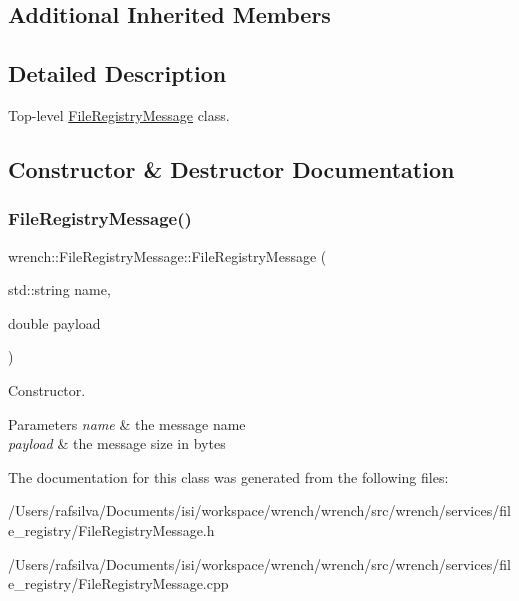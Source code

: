 \subsection*{Additional Inherited Members}


\subsection{Detailed Description}
Top-\/level \hyperlink{classwrench_1_1_file_registry_message}{File\+Registry\+Message} class. 

\subsection{Constructor \& Destructor Documentation}
\mbox{\label{classwrench_1_1_file_registry_message_a52902c49d15ab099f7ee1266652f62e3}} 
\subsubsection{\texorpdfstring{File\+Registry\+Message()}{FileRegistryMessage()}}
{\footnotesize\ttfamily wrench\+::\+File\+Registry\+Message\+::\+File\+Registry\+Message (\begin{DoxyParamCaption}\item[{std\+::string}]{name,  }\item[{double}]{payload }\end{DoxyParamCaption})\hspace{0.3cm}{\ttfamily [protected]}}



Constructor. 


\begin{DoxyParams}{Parameters}
{\em name} & the message name \\
\hline
{\em payload} & the message size in bytes \\
\hline
\end{DoxyParams}


The documentation for this class was generated from the following files\+:\begin{DoxyCompactItemize}
\item 
/\+Users/rafsilva/\+Documents/isi/workspace/wrench/wrench/src/wrench/services/file\+\_\+registry/File\+Registry\+Message.\+h\item 
/\+Users/rafsilva/\+Documents/isi/workspace/wrench/wrench/src/wrench/services/file\+\_\+registry/File\+Registry\+Message.\+cpp\end{DoxyCompactItemize}
